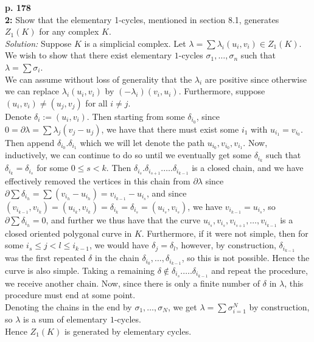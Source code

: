 \documentclass[a4paper]{article}
\begin{document}
    \textbf{p. 178}\\
    \textbf{2:} Show that the elementary 1-cycles, mentioned in section 8.1,
    generates $Z_1 (K)$ for any complex $K$.\\
    \linebreak
    \textit{Solution:} Suppose $K$ is a simplicial complex. Let
    $\lambda = \sum \lambda_i (u_i, v_i) \in Z_1(K)$. We wish to show that
    there
    exist elementary $1$-cycles $\sigma_1, \ldots, \sigma_n$ such that
    $\lambda = \sum \sigma_i$.\\
    We can assume without loss of generality that
    the $\lambda_i$ are positive since otherwise we can replace
    $\lambda_i (u_i, v_i)$ by $(- \lambda_i) (v_i, u_i)$. Furthermore, suppose
    $(u_i, v_i) \neq (u_j, v_j)$ for all $i\neq j$.\\
    Denote $\delta_{i} := (u_i, v_i)$. Then starting from some $\delta_{i_0}$,
    since
    $0 = \partial \lambda = 
    \sum \lambda_j (v_j -u_j) $, we have that there must exist some
    $i_1$ with $u_{i_1} = v_{i_0}$. Then append
    $\delta_{i_0}. \delta_{i_1} $ which we will let denote the path
    $u_{i_0}, v_{i_0}, v_{i_1}$. Now, inductively, we can continue to do so
    until we eventually get some
    $\delta_{i_k}$ such that $\delta_{i_k} = \delta_{i_s}$ for some
    $0 \le s < k$. Then
    $\delta_{i_s}. \delta_{i_{s+1}}. \ldots . \delta_{i_{k-1}}$ is a closed
    chain, and we have effectively removed the vertices in this chain from
    $\partial \lambda$ since
    $\partial  \sum \delta_{i_h} 
    = \sum (v_{i_h}-u_{i_h})
    = v_{i_{k-1}} - u_{i_s}$, and since
    $(v_{i_{k-1}}, v_{i_k}) =(u_{i_k},v_{i_k}) = \delta_{i_k} 
    = \delta_{i_s} = (u_{i_s}, v_{i_s})$, we have
    $v_{i_{k-1}} = u_{i_s}$, so
    $\partial  \sum \delta_{i_h} = 0$, and further we thus have that
    the curve $u_{i_s}, v_{i_{s}}, v_{i_{s+1}}, \ldots, 
    v_{i_{k-1}}$ is a closed oriented polygonal curve in $K$. Furthermore,
    if it were not simple, then for some
     $i_s \le j < l \le i_{k-1}$, we would have
     $\delta_j = \delta_l$, however, by construction,
     $\delta_{i_{k-1}}$ was the first repeated $\delta$ in the chain
     $\delta_{i_0}, \ldots, \delta_{i_{k-1}}$, so this is not possible. Hence
     the curve is also simple. Taking a remaining
     $\delta \not\in  \delta_{i_s}. \ldots . \delta_{i_{k-1}}$ and repeat the
     procedure, we receive another chain. Now, since there is only a finite
     number of $\delta$ in $\lambda$, this procedure must end at some point.\\
     Denoting the chains in the end by  $\sigma_1, \ldots, \sigma_{N}$, we get
     $\lambda = \sum \sigma_{i=1}^{N}$ by construction, so
     $\lambda$ is a sum of elementary $1$-cycles.\\
     Hence $Z_1(K)$ is generated by elementary cycles.\\
     \linebreak
\end{document}
